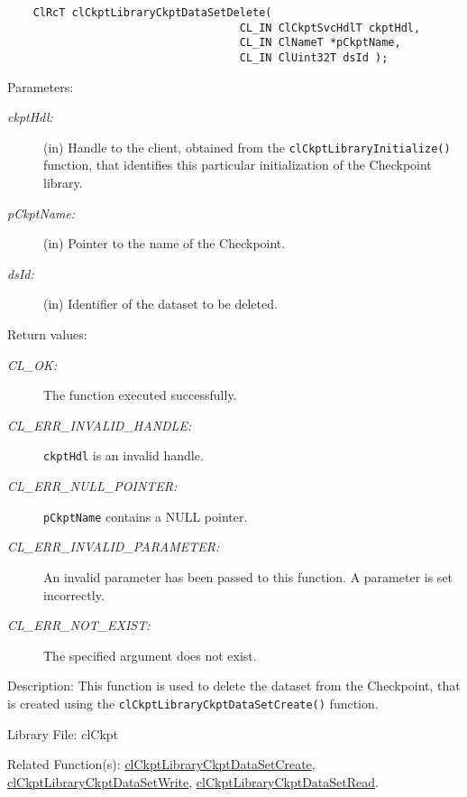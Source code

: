 \begin{flushleft}
\begin{Desc}
\footnotesize\begin{verbatim}    ClRcT clCkptLibraryCkptDataSetDelete(
                                	CL_IN ClCkptSvcHdlT ckptHdl,
                                	CL_IN ClNameT *pCkptName,
                                	CL_IN ClUint32T dsId );
\end{verbatim}
\normalsize
\end{Desc}
\begin{Desc}
\item[Parameters:]
\begin{description}
\item[{\em ckpt\-Hdl:}](in) Handle to the client, obtained from the {\tt{clCkptLibraryInitialize()}} function, that identifies this particular 
initialization of the Checkpoint library. 
\item[{\em p\-Ckpt\-Name:}](in) Pointer to the name of the Checkpoint. 
\item[{\em ds\-Id:}](in) Identifier of the dataset to be deleted.
\end{description}
\end{Desc}
\begin{Desc}
\item[Return values:]
\begin{description}
\item[{\em CL\_\-OK:}]The function executed successfully. 
\item[{\em CL\_\-ERR\_\-INVALID\_\-HANDLE:}]{\tt{ckptHdl}} is an invalid handle.
\item[{\em CL\_\-ERR\_\-NULL\_\-POINTER:}]{\tt{pCkptName}} contains a NULL pointer. 
\item[{\em CL\_\-ERR\_\-INVALID\_\-PARAMETER:}]An invalid parameter has been passed to this function. A parameter is set incorrectly.
\item[{\em CL\_\-ERR\_\-NOT\_\-EXIST:}]The specified argument does not exist.\end{description}
\end{Desc}
\begin{Desc}
\item[Description:]This function is used to delete the dataset from the Checkpoint, that is created using
the {\tt{clCkptLibraryCkptDataSetCreate()}} function.\end{Desc}
\begin{Desc}
\item[Library File:]cl\-Ckpt\end{Desc}
\begin{Desc}
\item[Related Function(s):]\hyperlink{pageckpt205}{cl\-Ckpt\-Library\-Ckpt\-Data\-Set\-Create}, 
\hyperlink{pageckpt207}{cl\-Ckpt\-Library\-Ckpt\-Data\-Set\-Write}, \hyperlink{pageckpt208}{cl\-Ckpt\-Library\-Ckpt\-Data\-Set\-Read}. \end{Desc}
\newpage



\end{flushleft}
